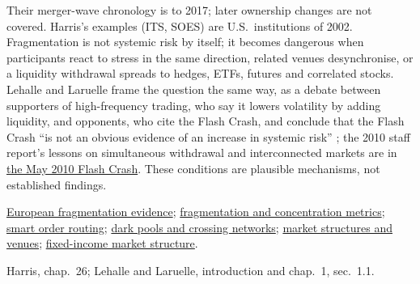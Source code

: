\begin{qfmechanism}
Their merger-wave chronology is to 2017; later ownership changes are not covered. Harris's examples (ITS, SOES) are U.S.\ institutions of 2002. Fragmentation is not systemic risk by itself; it becomes dangerous when participants react to stress in the same direction, related venues desynchronise, or a liquidity withdrawal spreads to hedges, ETFs, futures and correlated stocks. Lehalle and Laruelle frame the question the same way, as a debate between supporters of high-frequency trading, who say it lowers volatility by adding liquidity, and opponents, who cite the Flash Crash, and conclude that the Flash Crash ``is not an obvious evidence of an increase in systemic risk'' \citep[chap.~2, sec.~2.5, pp.~169 and~177]{alpha-laruelle}; the 2010 staff report's lessons on simultaneous withdrawal and interconnected markets are in \hyperref[ev:may-2010-flash-crash]{the May 2010 Flash Crash}. These conditions are plausible mechanisms, not established findings.

 \hyperref[ev:european-fragmentation-evidence]{European fragmentation evidence}; \hyperref[meth:fragmentation-concentration-metrics]{fragmentation and concentration metrics}; \hyperref[def:smart-order-routing]{smart order routing}; \hyperref[def:dark-pools-crossing]{dark pools and crossing networks}; \hyperref[def:market-structures-venues]{market structures and venues}; \hyperref[def:fixed-income-market-structure]{fixed-income market structure}.

 Harris, chap.~26; Lehalle and Laruelle, introduction and chap.~1, sec.~1.1.

\end{qfmechanism}

